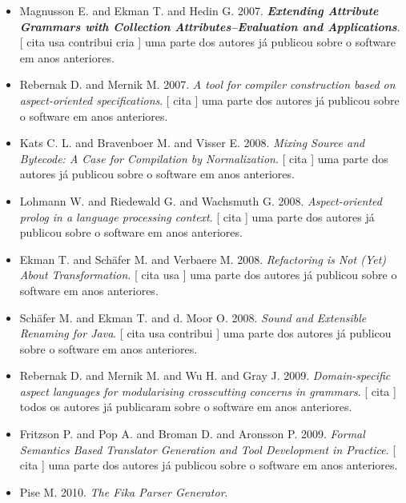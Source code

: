 \begin{itemize}
      [
          cita
          usa
      ]
uma parte dos autores já publicou sobre o software em anos anteriores.
\item Magnusson E. and Ekman T. and Hedin G.
      2007.
        \textbf{\textit{ Extending Attribute Grammars with Collection Attributes--Evaluation and Applications}}.
      [
          cita
          usa
          contribui
          cria
      ]
uma parte dos autores já publicou sobre o software em anos anteriores.
\item Rebernak D. and Mernik M.
      2007.
        \textit{ A tool for compiler construction based on aspect-oriented specifications}.
      [
          cita
      ]
uma parte dos autores já publicou sobre o software em anos anteriores.
\item Kats C. L. and Bravenboer M. and Visser E.
      2008.
        \textit{ Mixing Source and Bytecode: A Case for Compilation by Normalization}.
      [
          cita
      ]
uma parte dos autores já publicou sobre o software em anos anteriores.
\item Lohmann W. and Riedewald G. and Wachsmuth G.
      2008.
        \textit{ Aspect-oriented prolog in a language processing context}.
      [
          cita
      ]
uma parte dos autores já publicou sobre o software em anos anteriores.
\item Ekman T. and Sch\"{a}fer M. and Verbaere M.
      2008.
        \textit{ Refactoring is Not (Yet) About Transformation}.
      [
          cita
          usa
      ]
uma parte dos autores já publicou sobre o software em anos anteriores.
\item Sch\"{a}fer M. and Ekman T. and d. Moor O.
      2008.
        \textit{ Sound and Extensible Renaming for Java}.
      [
          cita
          usa
          contribui
      ]
uma parte dos autores já publicou sobre o software em anos anteriores.
\item Rebernak D. and Mernik M. and Wu H. and Gray J.
      2009.
        \textit{ Domain-specific aspect languages for modularising crosscutting concerns in grammars}.
      [
          cita
      ]
todos os autores já publicaram sobre o software em anos anteriores.
\item Fritzson P. and Pop A. and Broman D. and Aronsson P.
      2009.
        \textit{ Formal Semantics Based Translator Generation and Tool Development in Practice}.
      [
          cita
      ]
uma parte dos autores já publicou sobre o software em anos anteriores.
\item Pise M.
      2010.
        \textit{ The Fika Parser Generator}.

\end{itemize}
